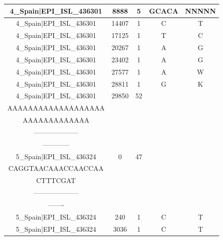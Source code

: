 \documentclass[a4paper,10pt]{article}
\begin{document}
\begin{longtable}{@{}ccccc@{}}
4\_Spain|EPI\_ISL\_436301 & 8888 & 5 & GCACA & NNNNN \\* \midrule
4\_Spain|EPI\_ISL\_436301 & 14407 & 1 & C & T \\* \midrule
4\_Spain|EPI\_ISL\_436301 & 17125 & 1 & T & C \\* \midrule
4\_Spain|EPI\_ISL\_436301 & 20267 & 1 & A & G \\* \midrule
4\_Spain|EPI\_ISL\_436301 & 23402 & 1 & A & G \\* \midrule
4\_Spain|EPI\_ISL\_436301 & 27577 & 1 & A & W \\* \midrule
4\_Spain|EPI\_ISL\_436301 & 28811 & 1 & G & K \\* \midrule
4\_Spain|EPI\_ISL\_436301 & 29850 & 52 & \begin{tabular}[c]{@{}c@{}}AGCTTCTTAGGAGAATGACA\\ AAAAAAAAAAAAAAAAAAA\\ AAAAAAAAAAAAA\end{tabular} & \begin{tabular}[c]{@{}c@{}}--------------------\\ --------------------\\ ------------\end{tabular} \\* \midrule
5\_Spain|EPI\_ISL\_436324 & 0 & 47 & \begin{tabular}[c]{@{}c@{}}ATTAAAGGTTTATACCTTCC\\ CAGGTAACAAACCAACCAA\\ CTTTCGAT\end{tabular} & \begin{tabular}[c]{@{}c@{}}--------------------\\ --------------------\\ -------\end{tabular} \\* \midrule
5\_Spain|EPI\_ISL\_436324 & 240 & 1 & C & T \\* \midrule
5\_Spain|EPI\_ISL\_436324 & 3036 & 1 & C & T \\* \midrule

\end{longtable}
\end{document}
